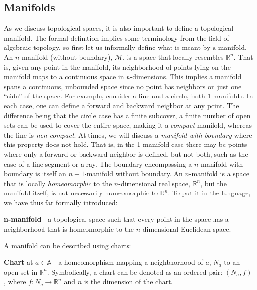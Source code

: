 \subsection{Manifolds}

As we discuss topological spaces, it is also important to define a topological manifold.
%
The formal definition implies some terminology from the field of algebraic topology, so first let us informally define what is meant by a manifold.
%
An $n$-manifold (without boundary), $\mathcal{M}$, is a space that locally resembles $\mathbb{R}^n$.
%
That is, given any point in the manifold, its neighborhood of points lying on the manifold maps to a continuous space in $n$-dimensions.
%
This implies a manifold spans a continuous, unbounded space since no point has neighbors on just one ``side'' of the space.
%
For example, consider a line and a circle, both 1-manifolds.
%
In each case, one can define a forward and backward neighbor at any point.
%
The difference being that the circle case has a finite subcover, a finite number of open sets can be used to cover the entire space, making it a \emph{compact} manifold, whereas the line is \emph{non-compact}.
%
At times, we will discuss a \emph{manifold with boundary} where this property does not hold.
%
That is, in the 1-manifold case there may be points where only a forward or backward neighbor is defined, but not both, such as the case of a line segment or a ray.
%
The boundary encompassing a $n$-manifold with boundary is itself an $n-1$-manifold without boundary.
%
An $n$-manifold is a space that is locally \emph{homeomorphic} to the $n$-dimensional real space, $\mathbb{R}^n$, but the manifold itself, is not necessarily homeomorphic to $\mathbb{R}^n$.
%
To put it in the language, we have thus far formally introduced:

\begin{defn}
  \textbf{n-manifold} - a topological space such that every point in the
  space has a neighborhood that is homeomorphic to the $n$-dimensional Euclidean
  space.
\end{defn}

A manifold can be described using charts:

\begin{defn}
  \textbf{Chart} at $a \in \mathbb{A}$ - a homeomorphism mapping a
  neighbhorhood of $a$, $N_a$ to an open set in $\mathbb{R}^n$. Symbolically,
  a chart can be denoted as an ordered pair: $(N_a,f)$, where $f: N_a
  \rightarrow \mathbb{R}^n$ and $n$ is the dimension of the chart.
\end{defn}

